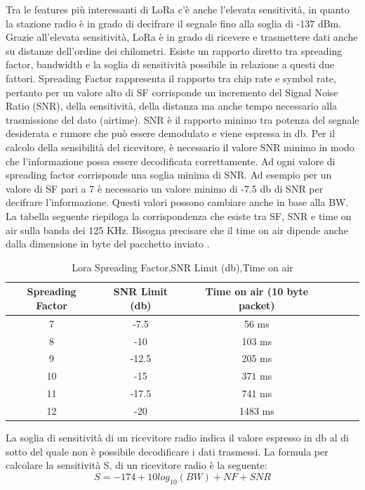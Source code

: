 \documentclass[12pt,a4paper,openright,twoside]{report}
\begin{document}
Tra le features pi\`u interessanti di LoRa c'\`e anche l'elevata sensitivit\`a, in quanto la stazione radio \`e in grado di decifrare il segnale fino alla soglia di -137 dBm. Grazie all'elevata sensitivit\`a, LoRa \`e in grado di ricevere e trasmettere dati anche su distanze dell'ordine dei chilometri. Esiste un rapporto diretto tra spreading factor, bandwidth e la soglia di sensitivit\`a possibile in relazione a questi due fattori. 
Spreading Factor rappresenta il rapporto tra chip rate e symbol rate, pertanto per un valore alto di SF corrisponde un incremento del Signal Noise Ratio (SNR), della sensitivit\`a, della distanza ma anche tempo necessario alla trasmissione del dato (airtime).
SNR \`e il rapporto minimo tra potenza del segnale desiderata e rumore che pu\`o essere demodulato e viene espressa in db. Per il calcolo della sensibilit\`a del ricevitore, \`e necessario il valore SNR minimo in modo che l'informazione possa essere decodificata correttamente. Ad ogni valore di spreading factor corrisponde una soglia minima di SNR. Ad esempio per un valore di SF pari a 7 \`e necessario un valore minimo di -7.5 db di SNR per decifrare l'informazione. Questi valori possono cambiare anche in base alla BW. La tabella seguente riepiloga la corrispondenza che esiste tra SF, SNR e time on air sulla banda dei 125 KHz. 
Bisogna precisare che il time on air dipende anche dalla dimensione in byte del pacchetto inviato \cite{K21}. 

\begin{table}
\begin{center}
\begin{tabular}{cccccc}
Spreading Factor&SNR Limit (db)&Time on air (10 byte packet)\\ \hline\hline
7&-7.5 &56 ms\\
\hline
8&-10&103 ms\\
\hline
9&-12.5&205 ms\\
\hline
10&-15&371 ms\\
\hline
11&-17.5&741 ms\\
\hline
12&-20&1483 ms\\
\hline
\end{tabular}
\caption[Lora Spreading Factor,SNR Limit (db),Time on air]{Lora Spreading Factor,SNR Limit (db),Time on air}\label{tab:quattro}
\end{center}
\end{table}



La soglia di sensitivit\`a di un ricevitore radio indica il valore espresso in db al di sotto del quale non \`e possibile decodificare i dati trasmessi. 
La formula per calcolare la sensitivit\`a S, di un ricevitore radio \`e la seguente:
\begin{equation*} S = -174 + 10log_{10}(BW) + NF + SNR  \end{equation*}
\end{document}
